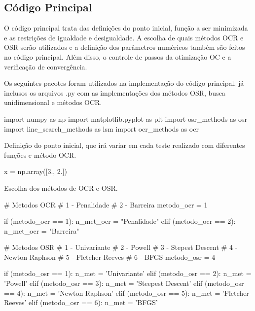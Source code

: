 \documentclass[10pt, a4paper]{article}
\begin{document}
\subsection{Código Principal}

O código principal trata das definições do ponto inicial, função a ser minimizada 
e as restrições de igualdade e desigualdade.
A escolha de quais métodos OCR e OSR serão utilizados e a definição dos parâmetros numéricos também são feitos no código principal.
Além disso, o controle de passos da otimização OC e a verificação de convergência.

\vspace{5mm}
Os seguintes pacotes foram utilizados na implementação do código principal, já inclusos os arquivos .py com
as implementações dos métodos OSR, busca unidimensional e métodos OCR.

\begin{python}
  import numpy as np
  import matplotlib.pyplot as plt
  import osr_methods as osr
  import line_search_methods as lsm
  import ocr_methods as ocr  
\end{python}

\vspace{5mm}
Definição do ponto inicial, que irá variar em cada teste realizado com diferentes funções e método OCR.

\begin{python}
  x = np.array([3., 2.])
\end{python}

\vspace{5mm}
Escolha dos métodos de OCR e OSR.

\begin{python}
  # Metodos OCR
  # 1 - Penalidade
  # 2 - Barreira
  metodo_ocr = 1

  if (metodo_ocr == 1):
      n_met_ocr = "Penalidade"
  elif (metodo_ocr == 2):
      n_met_ocr = "Barreira"

  # Metodos OSR
  # 1 - Univariante
  # 2 - Powell
  # 3 - Stepest Descent
  # 4 - Newton-Raphson
  # 5 - Fletcher-Reeves
  # 6 - BFGS
  metodo_osr = 4

  if (metodo_osr == 1):
      n_met = 'Univariante'
  elif (metodo_osr == 2):
      n_met = 'Powell'
  elif (metodo_osr == 3):
      n_met = 'Steepest Descent'
  elif (metodo_osr == 4):
      n_met = 'Newton-Raphson'
  elif (metodo_osr == 5):
      n_met = 'Fletcher-Reeves'
  elif (metodo_osr == 6):
      n_met = 'BFGS'  
\end{python}
\end{document}
